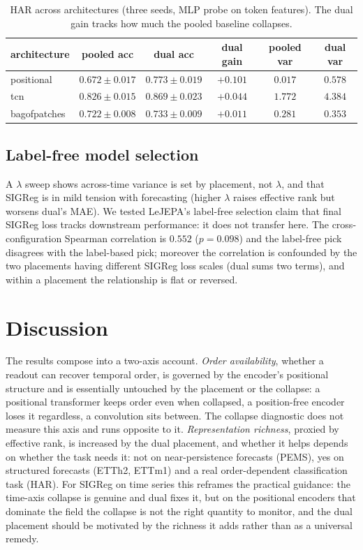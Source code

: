 \documentclass[11pt]{article}
\begin{document}
\begin{table}[t]
\centering\small
\caption{HAR across architectures (three seeds, MLP probe on token features). The dual gain tracks
how much the pooled baseline collapses.}
\label{tab:har_arch}
\begin{tabular}{l ccc cc}
\toprule
architecture & pooled acc & dual acc & dual gain & pooled var & dual var \\
\midrule
positional   & $0.672\pm0.017$ & $0.773\pm0.019$ & $+0.101$ & $0.017$ & $0.578$ \\
tcn          & $0.826\pm0.015$ & $0.869\pm0.023$ & $+0.044$ & $1.772$ & $4.384$ \\
bagofpatches & $0.722\pm0.008$ & $0.733\pm0.009$ & $+0.011$ & $0.281$ & $0.353$ \\
\bottomrule
\end{tabular}
\end{table}

\subsection{Label-free model selection}

A $\lambda$ sweep shows across-time variance is set by placement, not $\lambda$, and that SIGReg is
in mild tension with forecasting (higher $\lambda$ raises effective rank but worsens dual's MAE). We
tested LeJEPA's label-free selection claim that final SIGReg loss tracks downstream performance: it
does not transfer here. The cross-configuration Spearman correlation is $0.552$ ($p=0.098$) and the
label-free pick disagrees with the label-based pick; moreover the correlation is confounded by the
two placements having different SIGReg loss scales (dual sums two terms), and within a placement the
relationship is flat or reversed.

\section{Discussion}

The results compose into a two-axis account. \emph{Order availability}, whether a readout can
recover temporal order, is governed by the encoder's positional structure and is essentially
untouched by the placement or the collapse: a positional transformer keeps order even when
collapsed, a position-free encoder loses it regardless, a convolution sits between. The collapse
diagnostic does not measure this axis and runs opposite to it. \emph{Representation richness},
proxied by effective rank, is increased by the dual placement, and whether it helps depends on
whether the task needs it: not on near-persistence forecasts (PEMS), yes on structured forecasts
(ETTh2, ETTm1) and a real order-dependent classification task (HAR). For SIGReg on time series this
reframes the practical guidance: the time-axis collapse is genuine and dual fixes it, but on the
positional encoders that dominate the field the collapse is not the right quantity to monitor, and
the dual placement should be motivated by the richness it adds rather than as a universal remedy.
\end{document}
